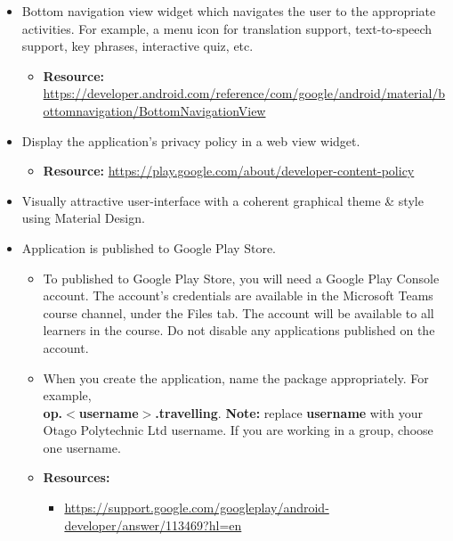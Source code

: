 \documentclass{article}
\begin{document}
\begin{itemize}
\begin{itemize}
\begin{itemize}
        \end{itemize}
    \end{itemize}
    \item Bottom navigation view widget which navigates the user to the appropriate activities. For example, a menu icon for translation support, text-to-speech support, key phrases, interactive quiz, etc.
    \begin{itemize}
        \item \textbf{Resource:} \footnotesize\href{https://developer.android.com/reference/com/google/android/material/bottomnavigation/BottomNavigationView}{https://developer.android.com/reference/com/google/android/material/bottomnavigation/BottomNavigationView}
    \end{itemize}
    \item Display the application's privacy policy in a web view widget.
    \begin{itemize}
        \item \textbf{Resource:} \footnotesize\href{https://play.google.com/about/developer-content-policy}{https://play.google.com/about/developer-content-policy}
    \end{itemize}
    \item Visually attractive user-interface with a coherent graphical theme \& style using Material Design.
    \item Application is published to Google Play Store.
    \begin{itemize}
        \item To published to Google Play Store, you will need a Google Play Console account. The account's credentials are available in the Microsoft Teams course channel, under the Files tab. The account will be available to all learners in the course. Do not disable any applications published on the account.
        \item When you create the application, name the package appropriately. For example, \\ \textbf{op.$<$username$>$.travelling}. \textbf{Note:} replace \textbf{username} with your Otago Polytechnic Ltd username. If you are working in a group, choose one username.
        \item \textbf{Resources:}
        \begin{itemize}
            \item \footnotesize\href{https://support.google.com/googleplay/android-developer/answer/113469?hl=en}{https://support.google.com/googleplay/android-developer/answer/113469?hl=en}

\end{itemize}
\end{itemize}
\end{itemize}
\end{document}
